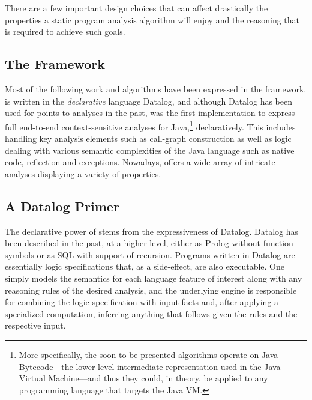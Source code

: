 There are a few important design choices that can affect drastically the
properties a static program analysis algorithm will enjoy and the reasoning
that is required to achieve such goals.


\subsection{The \doop{} Framework}

Most of the following work and algorithms have been expressed in the \doop{}
framework. \doop{} is written in the \emph{declarative} language Datalog, and
although Datalog has been used for points-to analyses in the past, \doop{} was
the first implementation to express full end-to-end context-sensitive analyses
for Java,\footnote{More specifically, the soon-to-be presented algorithms
operate on Java Bytecode---the lower-level intermediate representation used in
the Java Virtual Machine---and thus they could, in theory, be applied to any
programming language that targets the Java VM.} declaratively. This includes
handling key analysis elements such as call-graph construction as well as logic
dealing with various semantic complexities of the Java language such as native
code, reflection and exceptions. Nowadays, \doop{} offers a wide array of
intricate analyses displaying a variety of properties.


\subsection{A Datalog Primer}

The declarative power of \doop{} stems from the expressiveness of Datalog.
Datalog has been described in the past, at a higher level, either as Prolog
without function symbols or as SQL with support of recursion. Programs written
in Datalog are essentially logic specifications that, as a side-effect, are
also executable. One simply models the semantics for each language feature of
interest along with any reasoning rules of the desired analysis, and the
underlying engine is responsible for combining the logic specification with
input facts and, after applying a specialized computation, inferring anything
that follows given the rules and the respective input.

